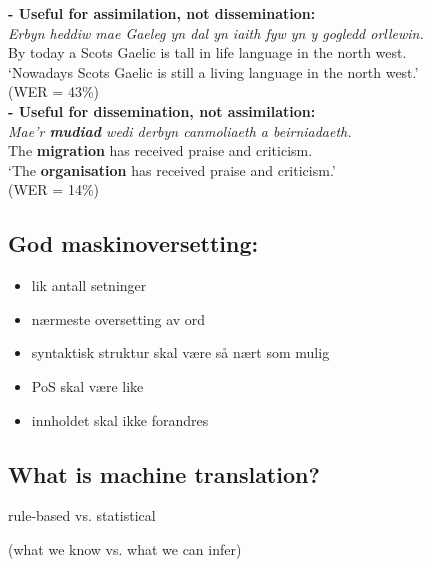 \documentclass[a4paper,english,12pt]{article}
\begin{document}
\begin{spacing}{1.0}
\textbf{- Useful for assimilation, not dissemination:}\\


\emph{Erbyn heddiw mae Gaeleg yn dal yn iaith fyw yn y gogledd orllewin. }\\


By today a Scots Gaelic is tall in life language in the north west.\\


`Nowadays Scots Gaelic is still a living language in the north west.'\\ (WER = 43\%)\\

\textbf{- Useful for dissemination, not assimilation:}\\

\emph{Mae'r \textbf{mudiad} wedi derbyn canmoliaeth a beirniadaeth.}\\


The \textbf{migration} has received praise and criticism.\\

`The \textbf{organisation} has received praise and criticism.'\\ (WER = 14\%)\\


\subsection{God maskinoversetting:}
\begin{itemize}
  \item lik antall setninger
  \item nærmeste oversetting av ord
  \item syntaktisk struktur skal være så nært som mulig
  \item PoS skal være like
  \item innholdet skal ikke forandres
\end{itemize}
 


 
\subsection{What is machine translation?}

  \begin{centering}

    {\Large rule-based vs. statistical}

    (what we know vs. what we can infer)

  \end{centering}


\end{spacing}
\end{document}
